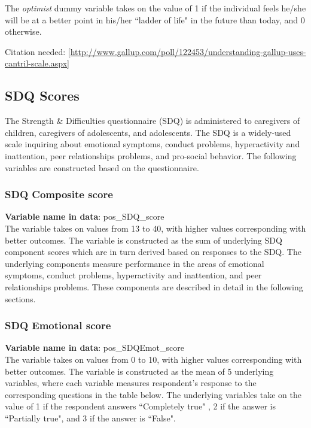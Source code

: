 \noindent The \textit{optimist} dummy variable takes on the value of 1 if the individual feels he/she will be at a better point in his/her ``ladder of life" in the future than today, and 0 otherwise. 

Citation needed: [\url{http://www.gallup.com/poll/122453/understanding-gallup-uses-cantril-scale.aspx}]

\subsection{SDQ Scores}
The  Strength \& Difficulties questionnaire (SDQ) is administered to caregivers of children, caregivers of adolescents, and adolescents.  The SDQ is a widely-used scale inquiring about emotional symptoms, conduct problems, hyperactivity and inattention, peer relationships problems, and pro-social behavior. The following variables are constructed based on the questionnaire.

\subsubsection{SDQ Composite score}
\textbf{Variable name in data}: pos\_SDQ\_score \\[.3cm]
The variable takes on values from 13 to 40, with higher values corresponding with better outcomes. The variable is constructed as the sum of underlying SDQ component scores which are in turn derived based on responses to the SDQ. The underlying components measure performance in the areas of emotional symptoms, conduct problems, hyperactivity and inattention, and peer relationships problems. These components are described in detail in the following sections.

\subsubsection{SDQ Emotional score}
\textbf{Variable name in data}: pos\_SDQEmot\_score \\[.3cm]
The variable takes on values from 0 to 10, with higher values corresponding with better outcomes. The variable is constructed as the mean of 5 underlying variables, where each variable measures respondent's response to the corresponding questions in the table below. The underlying variables take on the value of 1 if the respondent answers  ``Completely true" , 2 if the answer is ``Partially true", and 3 if the answer is ``False". \\

